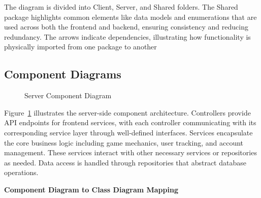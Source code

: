 \documentclass[11pt,a4paper]{article}
\newcommand{\inputdiagram}[1]{}
\newcommand{\textwidthdiagram}[2][1]{%
  \resizebox{#1\textwidth}{!}{\inputdiagram{#2}}%
}
\begin{document}
The diagram is divided into Client, Server, and Shared folders. The Shared package highlights common elements like data models and enumerations that are used across both the frontend and backend, ensuring consistency and reducing redundancy. The arrows indicate dependencies, illustrating how functionality is physically imported from one package to another



\subsection{Component Diagrams}

\begin{figure}[H]
    \centering
    \textwidthdiagram{server_component_diagram.latex}
    \caption{Server Component Diagram}
    \label{fig:server_component_diagram}
\end{figure}

Figure~\ref{fig:server_component_diagram} illustrates the server-side component architecture. Controllers provide API endpoints for frontend services, with each controller communicating with its corresponding service layer through well-defined interfaces. Services encapsulate the core business logic including game mechanics, user tracking, and account management. These services interact with other necessary services or repositories as needed. Data access is handled through repositories that abstract database operations.


\textbf{Component Diagram to Class Diagram Mapping}
\end{document}
